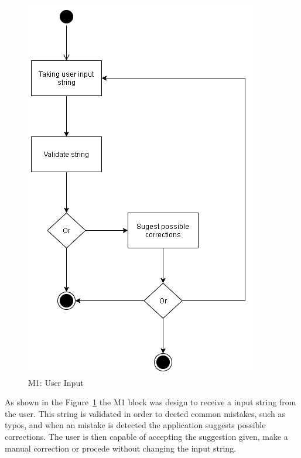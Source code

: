 \begin{figure}[H]
\centering
\includegraphics[scale=0.5]{ch4/assets/M1.png}
\caption[User Input Module]{M1: User Input}
\label{fig:M1}
\end{figure}

As shown in the Figure~\ref{fig:M1} the M1 block was design to receive a input string from the user.
This string is validated in order to dected common mistakes, such as typos, and when an mistake is detected the application suggests possible corrections.
The user is then capable of accepting the suggestion given, make a manual correction or procede without changing the input string.

